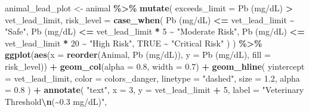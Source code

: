 \documentclass[
]{article}
\newenvironment{Shaded}{\begin{snugshade}}{\end{snugshade}}
\newcommand{\AttributeTok}[1]{\textcolor[rgb]{0.13,0.29,0.53}{#1}}
\newcommand{\ConstantTok}[1]{\textcolor[rgb]{0.56,0.35,0.01}{#1}}
\newcommand{\DecValTok}[1]{\textcolor[rgb]{0.00,0.00,0.81}{#1}}
\newcommand{\FloatTok}[1]{\textcolor[rgb]{0.00,0.00,0.81}{#1}}
\newcommand{\FunctionTok}[1]{\textcolor[rgb]{0.13,0.29,0.53}{\textbf{#1}}}
\newcommand{\NormalTok}[1]{#1}
\newcommand{\OtherTok}[1]{\textcolor[rgb]{0.56,0.35,0.01}{#1}}
\newcommand{\SpecialCharTok}[1]{\textcolor[rgb]{0.81,0.36,0.00}{\textbf{#1}}}
\newcommand{\StringTok}[1]{\textcolor[rgb]{0.31,0.60,0.02}{#1}}
\begin{document}
\begin{Shaded}
\begin{Highlighting}[]
\NormalTok{animal\_lead\_plot }\OtherTok{\textless{}{-}}\NormalTok{ animal }\SpecialCharTok{\%\textgreater{}\%}
  \FunctionTok{mutate}\NormalTok{(}
    \AttributeTok{exceeds\_limit =} \StringTok{\textasciigrave{}}\AttributeTok{Pb (mg/dL)}\StringTok{\textasciigrave{}} \SpecialCharTok{\textgreater{}}\NormalTok{ vet\_lead\_limit,}
    \AttributeTok{risk\_level =} \FunctionTok{case\_when}\NormalTok{(}
      \StringTok{\textasciigrave{}}\AttributeTok{Pb (mg/dL)}\StringTok{\textasciigrave{}} \SpecialCharTok{\textless{}=}\NormalTok{ vet\_lead\_limit }\SpecialCharTok{\textasciitilde{}} \StringTok{"Safe"}\NormalTok{,}
      \StringTok{\textasciigrave{}}\AttributeTok{Pb (mg/dL)}\StringTok{\textasciigrave{}} \SpecialCharTok{\textless{}=}\NormalTok{ vet\_lead\_limit }\SpecialCharTok{*} \DecValTok{5} \SpecialCharTok{\textasciitilde{}} \StringTok{"Moderate Risk"}\NormalTok{,}
      \StringTok{\textasciigrave{}}\AttributeTok{Pb (mg/dL)}\StringTok{\textasciigrave{}} \SpecialCharTok{\textless{}=}\NormalTok{ vet\_lead\_limit }\SpecialCharTok{*} \DecValTok{20} \SpecialCharTok{\textasciitilde{}} \StringTok{"High Risk"}\NormalTok{,}
      \ConstantTok{TRUE} \SpecialCharTok{\textasciitilde{}} \StringTok{"Critical Risk"}
\NormalTok{    )}
\NormalTok{  ) }\SpecialCharTok{\%\textgreater{}\%}
  \FunctionTok{ggplot}\NormalTok{(}\FunctionTok{aes}\NormalTok{(}\AttributeTok{x =} \FunctionTok{reorder}\NormalTok{(Animal, }\StringTok{\textasciigrave{}}\AttributeTok{Pb (mg/dL)}\StringTok{\textasciigrave{}}\NormalTok{), }\AttributeTok{y =} \StringTok{\textasciigrave{}}\AttributeTok{Pb (mg/dL)}\StringTok{\textasciigrave{}}\NormalTok{, }\AttributeTok{fill =}\NormalTok{ risk\_level)) }\SpecialCharTok{+}
  \FunctionTok{geom\_col}\NormalTok{(}\AttributeTok{alpha =} \FloatTok{0.8}\NormalTok{, }\AttributeTok{width =} \FloatTok{0.7}\NormalTok{) }\SpecialCharTok{+}
  \FunctionTok{geom\_hline}\NormalTok{(}
    \AttributeTok{yintercept =}\NormalTok{ vet\_lead\_limit, }
    \AttributeTok{color =}\NormalTok{ colors\_danger, }
    \AttributeTok{linetype =} \StringTok{"dashed"}\NormalTok{, }
    \AttributeTok{size =} \FloatTok{1.2}\NormalTok{,}
    \AttributeTok{alpha =} \FloatTok{0.8}
\NormalTok{  ) }\SpecialCharTok{+}
  \FunctionTok{annotate}\NormalTok{(}
    \StringTok{"text"}\NormalTok{,}
    \AttributeTok{x =} \DecValTok{3}\NormalTok{, }\AttributeTok{y =}\NormalTok{ vet\_lead\_limit }\SpecialCharTok{+} \DecValTok{5}\NormalTok{,}
    \AttributeTok{label =} \StringTok{"Veterinary Threshold}\SpecialCharTok{\textbackslash{}n}\StringTok{(\textasciitilde{}0.3 mg/dL)"}\NormalTok{,}

\end{Highlighting}
\end{Shaded}
\end{document}
